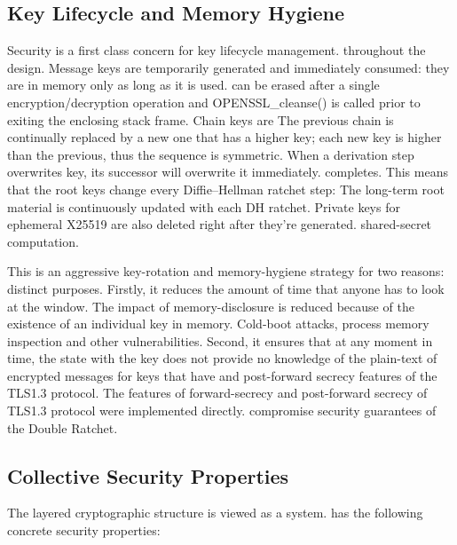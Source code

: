 \documentclass[conference]{IEEEtran}
\begin{document}
\subsection{Key Lifecycle and Memory Hygiene}

Security is a first class concern for key lifecycle management.
throughout the design.  Message keys are temporarily generated and
immediately consumed: they are in memory only as long as it is used.
can be erased after a single encryption/decryption operation and
OPENSSL\_cleanse() is called prior to exiting the enclosing stack frame.  Chain keys are
The previous chain is continually replaced by a new one that has a higher key; each new key is higher than the previous, thus the sequence is symmetric.
When a derivation step overwrites key, its successor will overwrite it immediately.
completes.  This means that the root keys change every Diffie–Hellman ratchet step:
The long-term root material is continuously updated with each DH ratchet.
Private keys for ephemeral X25519 are also deleted right after they're generated.
shared-secret computation.

This is an aggressive key-rotation and memory-hygiene strategy for two reasons:
distinct purposes.  Firstly, it reduces the amount of time that anyone has to look at the window.
The impact of memory-disclosure is reduced because of the existence of an individual key in memory.
Cold-boot attacks, process memory inspection and other vulnerabilities.
Second, it ensures that at any moment in time, the state with the key does not provide no
knowledge of the plain-text of encrypted messages for keys that have
and post-forward secrecy features of the TLS1.3 protocol. The features of forward-secrecy and post-forward secrecy of TLS1.3 protocol were implemented directly.
compromise security guarantees of the Double Ratchet.

\subsection{Collective Security Properties}

The layered cryptographic structure is viewed as a system.
has the following concrete security properties:
\end{document}
